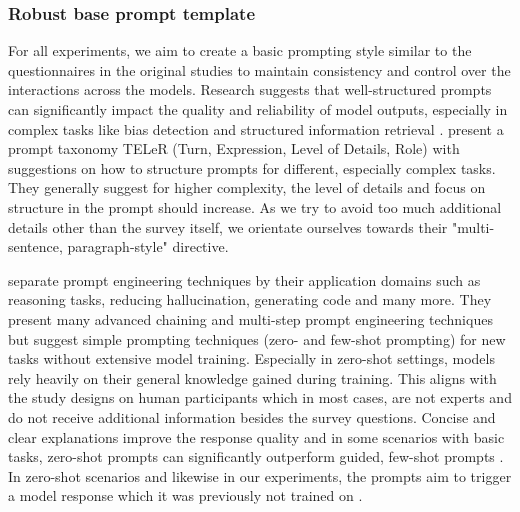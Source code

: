 \newpage
\subsubsection{Robust base prompt template}
\par For all experiments, we aim to create a basic prompting style similar to the questionnaires in the original studies to maintain consistency and control over the interactions across the models. Research suggests that well-structured prompts can significantly impact the quality and reliability of model outputs, especially in complex tasks like bias detection and structured information retrieval \parencite{chen2023unleashing,santu2023teler}. \textcite{santu2023teler} present a prompt taxonomy TELeR (Turn, Expression, Level of Details, Role) with suggestions on how to structure prompts for different, especially complex tasks. They generally suggest for higher complexity, the level of details and focus on structure in the prompt should increase. As we try to avoid too much additional details other than the survey itself, we orientate ourselves towards their "multi-sentence, paragraph-style" directive.

\par \textcite{sahoo2024systematic} separate prompt engineering techniques by their application domains such as reasoning tasks, reducing hallucination, generating code and many more. They present many advanced chaining and multi-step prompt engineering techniques but suggest simple prompting techniques (zero- and few-shot prompting) for new tasks without extensive model training. Especially in zero-shot settings, models rely heavily on their general knowledge gained during training. This aligns with the study designs on human participants which in most cases, are not experts and do not receive additional information besides the survey questions. Concise and clear explanations improve the response quality and in some scenarios with basic tasks, zero-shot prompts can significantly outperform guided, few-shot prompts \parencite{chen2023unleashing,ekin2023prompt}. In zero-shot scenarios and likewise in our experiments, the prompts aim to trigger a model response which it was previously not trained on \parencite{marvin2023prompt}.

